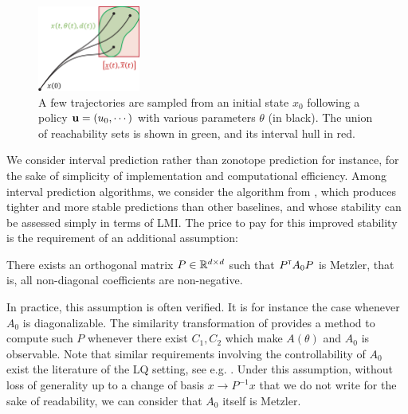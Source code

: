 \documentclass{article}
\begin{document}
\begin{figure}
    \centering
    \includegraphics[width=0.3\textwidth]{img/interval-hull}
    \caption{A few trajectories are sampled from an initial state $x_0$ following a policy $\mathbf{u}=(u_0,\cdots)$ with various parameters $\theta$ (in black). The union of reachability sets is shown in green, and its interval hull in red.}
    \label{fig:interval-hull}
\end{figure}

We consider interval prediction rather than zonotope prediction for instance, for the sake of simplicity of implementation and computational efficiency. Among interval prediction algorithms, we consider the algorithm from \citep{leurent2019interval}, which produces tighter and more stable predictions than other baselines, and whose stability can be assessed simply in terms of LMI. The price to pay for this improved stability is the requirement of an additional assumption:

\begin{assumption}
There exists an orthogonal matrix $P\in\mathbb{R}^{d\times d}$ such that $P^{\mathsf{\scriptscriptstyle T}} A_0 P$ is Metzler, that is, all non-diagonal coefficients are non-negative.
\end{assumption}
In practice, this assumption is often verified. It is for instance the case whenever $A_0$ is diagonalizable. The similarity transformation of \citep{Efimov_a2013} provides a method to compute such $P$ whenever there exist $C_1,C_2$ which make $A(\theta)$ and $A_0$ is observable. Note that similar requirements involving the controllability of $A_0$ exist the literature of the LQ setting, see e.g. \citep{abbasi-yadkori11a,abeille18a}.
Under this assumption, without loss of generality up to a change of basis $x\rightarrow P^{-1}x$ that we do not write for the sake of readability, we can consider that $A_0$ itself is Metzler.
\end{document}
